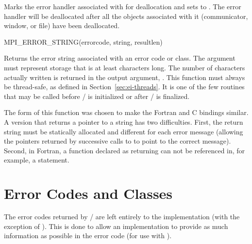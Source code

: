 Marks the error handler associated with  for
deallocation and sets  to
.
The error handler will be deallocated after
all 
the objects
associated with it 
(communicator, window, or file)
have been deallocated.

\begin{funcdef}{MPI\_ERROR\_STRING}{(\mbox{errorcode}, \mbox{string}, \mbox{resultlen})}
\end{funcdef}

Returns the error string associated with an error code
or class.
The argument  must represent storage that is at least
 characters long.
%
The number of characters actually written
is returned in the output argument, .
%
This function must always be thread-safe, as defined in
Section~\ref{sec:ei-threads}.
It is one of the few routines that may be called before
\MPI/ is initialized or after \MPI/ is finalized.

\begin{rationale}
The form of this function was chosen to make the Fortran and C
bindings similar.  A version that returns a pointer to a string has two
difficulties.  First, the return string must be statically allocated and
different for each error message (allowing the pointers returned by
successive calls to  to point to the correct
message).  Second, in Fortran, a function declared as returning
 can not be referenced in, for example, a
 statement.
\end{rationale}

\section{Error Codes and Classes}
\label{sec:ei-error-classes}
The error codes returned by \MPI/ are left entirely to the
implementation (with the
exception of ).  This is done to allow an implementation to
provide as much information as possible in the error code (for use with
).

